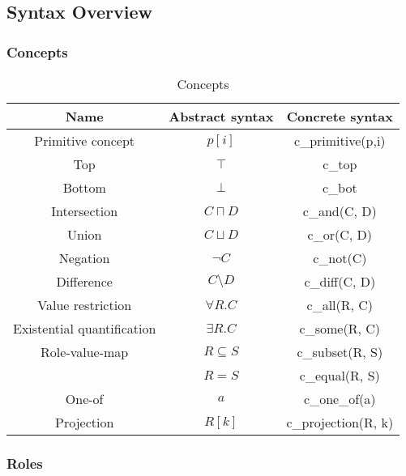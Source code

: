 \documentclass{article}
\begin{document}
\subsection{Syntax Overview}

\subsubsection{Concepts}

\begin{table}[H]
    \centering
    \begin{tabular}{ccc}
    Name & Abstract syntax & Concrete syntax \\
    \hline
    Primitive concept & $p[i]$ & c\_primitive(p,i) \\
    Top & $\top$ & c\_top \\
    Bottom & $\bot$ & c\_bot \\
    Intersection & $C\sqcap D$ & c\_and(C, D) \\
    Union & $C\sqcup D$ & c\_or(C, D) \\
    Negation & $\neg C$ & c\_not(C) \\
    Difference & $C\setminus D$ & c\_diff(C, D) \\
    Value restriction & $\forall R.C$ & c\_all(R, C) \\
    Existential quantification & $\exists R.C$ & c\_some(R, C) \\
    Role-value-map & $R\subseteq S$ & c\_subset(R, S) \\
     & $R = S$ & c\_equal(R, S) \\
    One-of & $a$ & c\_one\_of(a) \\
    Projection & $R[k]$ & c\_projection(R, k) \\
    \end{tabular}
    \caption{Concepts}
\end{table}

\subsubsection{Roles}
\end{document}
